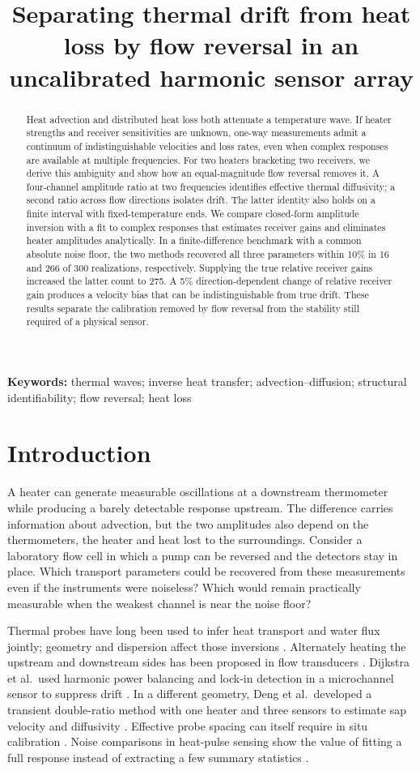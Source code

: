 \documentclass[11pt]{article}
\title{Separating thermal drift from heat loss by flow reversal in an uncalibrated harmonic sensor array}
\author{}
\date{}
\begin{document}
\maketitle
\begin{abstract}
Heat advection and distributed heat loss both attenuate a temperature wave. If heater strengths and receiver sensitivities are unknown, one-way measurements admit a continuum of indistinguishable velocities and loss rates, even when complex responses are available at multiple frequencies. For two heaters bracketing two receivers, we derive this ambiguity and show how an equal-magnitude flow reversal removes it. A four-channel amplitude ratio at two frequencies identifies effective thermal diffusivity; a second ratio across flow directions isolates drift. The latter identity also holds on a finite interval with fixed-temperature ends. We compare closed-form amplitude inversion with a fit to complex responses that estimates receiver gains and eliminates heater amplitudes analytically. In a finite-difference benchmark with a common absolute noise floor, the two methods recovered all three parameters within 10\% in 16 and 266 of 300 realizations, respectively. Supplying the true relative receiver gains increased the latter count to 275. A 5\% direction-dependent change of relative receiver gain produces a velocity bias that can be indistinguishable from true drift. These results separate the calibration removed by flow reversal from the stability still required of a physical sensor.
\end{abstract}
\noindent\textbf{Keywords:} thermal waves; inverse heat transfer; advection--diffusion; structural identifiability; flow reversal; heat loss

\section{Introduction}
A heater can generate measurable oscillations at a downstream thermometer while producing a barely detectable response upstream. The difference carries information about advection, but the two amplitudes also depend on the thermometers, the heater and heat lost to the surroundings. Consider a laboratory flow cell in which a pump can be reversed and the detectors stay in place. Which transport parameters could be recovered from these measurements even if the instruments were noiseless? Which would remain practically measurable when the weakest channel is near the noise floor?

Thermal probes have long been used to infer heat transport and water flux jointly; geometry and dispersion affect those inversions \cite{hopmans}. Alternately heating the upstream and downstream sides has been proposed in flow transducers \cite{transducer}. Dijkstra et al.\ used harmonic power balancing and lock-in detection in a microchannel sensor to suppress drift \cite{dijkstra}. In a different geometry, Deng et al.\ developed a transient double-ratio method with one heater and three sensors to estimate sap velocity and diffusivity \cite{deng}. Effective probe spacing can itself require in situ calibration \cite{kinar}. Noise comparisons in heat-pulse sensing show the value of fitting a full response instead of extracting a few summary statistics \cite{noise}.
\end{document}
